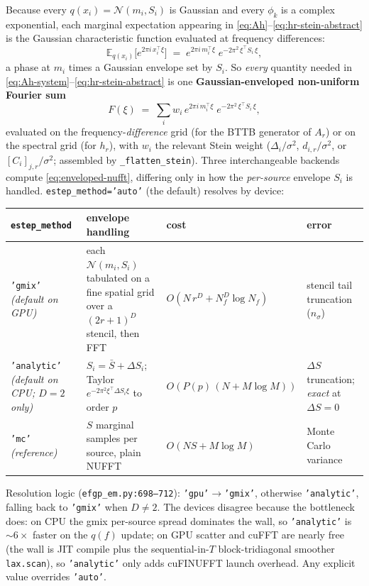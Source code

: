 \documentclass[11pt]{article}
\newcommand{\Eqx}{\mathbb{E}_{q(x_i)}}
\newcommand{\code}[1]{\texttt{\small #1}}
\begin{document}
Because every $q(x_i)=\mathcal{N}(m_i,S_i)$ is Gaussian and every $\phi_k$
is a complex exponential, each marginal expectation appearing in
\eqref{eq:Ah}--\eqref{eq:hr-stein-abstract} is the Gaussian characteristic
function evaluated at frequency differences:
\begin{equation}
\Eqx\!\bigl[e^{2\pi i\,x_i^\top\xi}\bigr]
\;=\;
e^{2\pi i\,m_i^\top\xi}\;e^{-2\pi^2\,\xi^\top S_i\,\xi},
\label{eq:Eqx-chi}
\end{equation}
a phase at $m_i$ times a Gaussian envelope set by $S_i$. So \emph{every}
quantity needed in \eqref{eq:Ah-system}--\eqref{eq:hr-stein-abstract} is
one \textbf{Gaussian-enveloped non-uniform Fourier sum}
\begin{equation}
F(\xi)\;=\;\sum_i w_i\, e^{2\pi i\, m_i^\top \xi}\; e^{-2\pi^2\,\xi^\top S_i\,\xi},
\label{eq:enveloped-nufft}
\end{equation}
evaluated on the frequency-\emph{difference} grid (for the BTTB generator
of $A_r$) or on the spectral grid (for $h_r$), with $w_i$ the relevant
Stein weight ($\Delta_i/\sigma^2$, $d_{i,r}/\sigma^2$, or
$[C_i]_{j,r}/\sigma^2$; assembled by \code{\_flatten\_stein}). Three
interchangeable backends compute \eqref{eq:enveloped-nufft}, differing
only in how the \emph{per-source} envelope $S_i$ is handled.
\code{estep\_method='auto'} (the default) resolves by device:

\begin{center}
\renewcommand{\arraystretch}{1.3}
\footnotesize
\begin{tabular}{@{}p{2.2cm}|p{4.9cm}|p{3.1cm}|p{4.4cm}@{}}
\hline
\code{estep\_method} & envelope handling & cost & error \\\hline
\code{'gmix'} \emph{(default on GPU)}
 & each $\mathcal{N}(m_i,S_i)$ tabulated on a fine
   spatial grid over a $(2r{+}1)^D$ stencil, then FFT
 & $O(N\,r^D + N_f^D\log N_f)$
 & stencil tail truncation ($n_\sigma$) \\
\code{'analytic'} \emph{(default on CPU; $D{=}2$ only)}
 & $S_i = \bar S + \Delta S_i$; Taylor
   $e^{-2\pi^2\xi^\top\Delta S_i\xi}$ to order $p$
 & $O(P(p)\,(N + M\log M))$
 & $\Delta S$ truncation; \emph{exact} at $\Delta S{=}0$ \\
\code{'mc'} \emph{(reference)}
 & $S$ marginal samples per source, plain NUFFT
 & $O(NS + M\log M)$
 & Monte Carlo variance \\\hline
\end{tabular}
\end{center}

\noindent
Resolution logic (\code{efgp\_em.py:698--712}): \code{'gpu'}$\to$\code{'gmix'},
otherwise \code{'analytic'}, falling back to \code{'gmix'} when $D\ne 2$.
The devices disagree because the bottleneck does: on CPU the gmix
per-source spread dominates the wall, so \code{'analytic'} is ${\sim}6\times$
faster on the $q(f)$ update; on GPU scatter and cuFFT are nearly free
(the wall is JIT compile plus the sequential-in-$T$ block-tridiagonal
smoother \code{lax.scan}), so \code{'analytic'} only adds cuFINUFFT
launch overhead. Any explicit value overrides \code{'auto'}.
\end{document}
